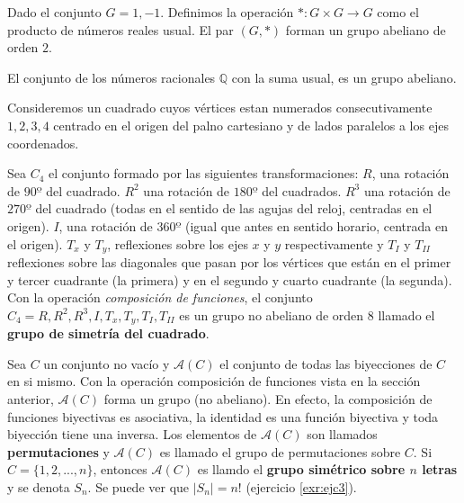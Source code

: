 \documentclass[12pt,]{krantz}
\theoremstyle{definition}
\theoremstyle{definition}
\theoremstyle{definition}
\theoremstyle{remark}
\let\BeginKnitrBlock\begin \let\EndKnitrBlock\end
\begin{document}
\BeginKnitrBlock{example}
\protect\hypertarget{exm:unnamed-chunk-51}{}{\label{exm:unnamed-chunk-51}
}Dado el conjunto \(G={1,-1}\). Definimos la operación
\(\ast:G\times G \longrightarrow G\) como el producto de números reales
usual. El par \((G,\ast)\) forman un grupo abeliano de orden \(2\).
\EndKnitrBlock{example}

\BeginKnitrBlock{example}
\protect\hypertarget{exm:unnamed-chunk-52}{}{\label{exm:unnamed-chunk-52}
}El conjunto de los números racionales \(\mathbb{Q}\) con la suma usual,
es un grupo abeliano.
\EndKnitrBlock{example}

\BeginKnitrBlock{example}
\protect\hypertarget{exm:unnamed-chunk-53}{}{\label{exm:unnamed-chunk-53}
}Consideremos un cuadrado cuyos vértices estan numerados
consecutivamente \(1,2,3,4\) centrado en el origen del palno cartesiano
y de lados paralelos a los ejes coordenados.

Sea \(C_{4}\) el conjunto formado por las siguientes transformaciones:
\(R\), una rotación de \(90º\) del cuadrado. \(R^{2}\) una rotación de
\(180º\) del cuadrados. \(R^{3}\) una rotación de \(270º\) del cuadrado
(todas en el sentido de las agujas del reloj, centradas en el origen).
\(I\), una rotación de \(360º\) (igual que antes en sentido horario,
centrada en el origen). \(T_{x}\) y \(T_{y}\), reflexiones sobre los
ejes \(x\) y \(y\) respectivamente y \(T_{I}\) y \(T_{II}\) reflexiones
sobre las diagonales que pasan por los vértices que están en el primer y
tercer cuadrante (la primera) y en el segundo y cuarto cuadrante (la
segunda). Con la operación \emph{composición de funciones}, el conjunto
\(C_{4} = {R, R^{2}, R^{3}, I, T_{x}, T_{y}, T_{I}, T_{II}}\) es un
grupo no abeliano de orden \(8\) llamado el \textbf{grupo de simetría
del cuadrado}.
\EndKnitrBlock{example}

\BeginKnitrBlock{example}
\protect\hypertarget{exm:unnamed-chunk-54}{}{\label{exm:unnamed-chunk-54}
}Sea \(C\) un conjunto no vacío y \(\mathcal{A}(C)\) el conjunto de
todas las biyecciones de \(C\) en si mismo. Con la operación composición
de funciones vista en la sección anterior, \(\mathcal{A}(C)\) forma un
grupo (no abeliano). En efecto, la composición de funciones biyectivas
es asociativa, la identidad es una función biyectiva y toda biyección
tiene una inversa. Los elementos de \(\mathcal{A}(C)\) son llamados
\textbf{permutaciones} y \(\mathcal{A}(C)\) es llamado el grupo de
permutaciones sobre \(C\). Si \(C=\{1,2, ..., n\}\), entonces
\(\mathcal{A}(C)\) es llamdo el \textbf{grupo simétrico sobre \(n\)
letras} y se denota \(S_{n}\). Se puede ver que \(|S_{n}|=n!\)
(ejercicio \ref{exr:ejc3}).
\EndKnitrBlock{example}
\end{document}
